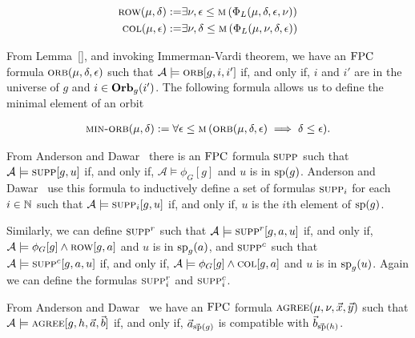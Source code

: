 \documentclass[../paper.tex]{subfiles}
\begin{document}
\begin{align*}
	\textsc{row} (\mu, \delta) :=   & \exists \nu, \epsilon \leq \textsc{m} \, (\Phi_L (\mu, \delta, \epsilon, \nu)) \\
	\textsc{col} (\mu, \epsilon) := & \exists \nu, \delta \leq \textsc{m} \, (\Phi_L (\mu, \nu, \delta , \epsilon))  
\end{align*}

From Lemma~\ref{}, and invoking Immerman-Vardi theorem, we have an $\text{\upshape FPC}$
formula $\textsc{orb}(\mu, \delta, \epsilon)$ such that $\mathcal{A} \models
\textsc{orb}[g,i, i']$ if, and only if, $i$ and $i'$ are in the universe of $g$ and
$i \in \text{\textbf{Orb}}_g(i')$. The following formula allows us to define the minimal
element of an orbit

\begin{align*}
	\textsc{min-orb} (\mu, \delta) := \forall \epsilon \leq \textsc{m} \, (\textsc{orb} (\mu, \delta, \epsilon) \implies \delta \leq \epsilon). 
\end{align*}


From Anderson and Dawar~\cite{AndersonD17} there is an $\text{\upshape FPC}$ formula $\textsc{supp}$ such that $\mathcal{A} \models \textsc{supp} [g, u]$ if, and only if, $\mathcal{A} \models \phi_G [g]$ and $u$ is in $\text{sp}(g)$. Anderson and Dawar~\cite{AndersonD17} use this formula to inductively define a set of formulas $\textsc{supp}_i$ for each $i \in \mathbb{N}$ such that $\mathcal{A} \models \textsc{supp}_i[g, u]$ if, and only if, $u$ is the $i$th element of $\text{sp}(g)$.

Similarly, we can define $\textsc{supp}^r$ such that $\mathcal{A} \models
\textsc{supp}^r[g, a, u]$ if, and only if, $\mathcal{A} \models \phi_G [g] \land
\textsc{row}[g, a]$ and $u$ is in $\text{sp}_g(a)$, and $\textsc{supp}^c$ such that
$\mathcal{A} \models \textsc{supp}^c[g, a, u]$ if, and only if, $\mathcal{A} \models
\phi_G [g] \land \textsc{col}[g, a]$ and $u$ is in $\text{sp}_g(u)$. Again we can
define the formulas $\textsc{supp}^r_i$ and $\textsc{supp}^c_i$.

From Anderson and Dawar~\cite{AndersonD17} we have an $\text{\upshape FPC}$ formula $\textsc{agree}(\mu, \nu, \vec{x}, \vec{y})$ such that $\mathcal{A} \models \textsc{agree}[g, h, \vec{a}, \vec{b}]$ if, and only if, $\vec{a}_{\vec{\text{sp}}(g)}$ is compatible with $\vec{b}_{\vec{\text{sp}}(h)}$.  
\end{document}
